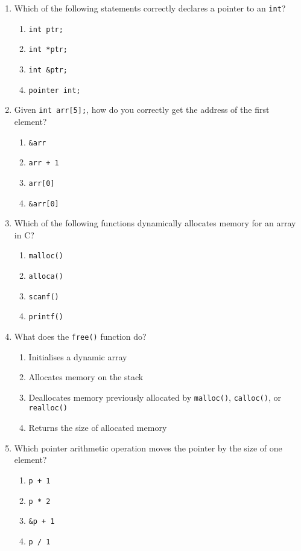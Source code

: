 \documentclass[a4paper,12pt]{article}
\begin{document}
\begin{enumerate}
  \item Which of the following statements correctly declares a pointer to an \texttt{int}?
  \begin{enumerate}[label=(\alph*)]
    \item \texttt{int ptr;}
    \item \texttt{int *ptr;}
    \item \texttt{int \&ptr;}
    \item \texttt{pointer int;}
  \end{enumerate}

  \item Given \texttt{int arr[5];}, how do you correctly get the address of the first element?
  \begin{enumerate}[label=(\alph*)]
    \item \texttt{\&arr}
    \item \texttt{arr + 1}
    \item \texttt{arr[0]}
    \item \texttt{\&arr[0]}
  \end{enumerate}

  \item Which of the following functions dynamically allocates memory for an array in C?
  \begin{enumerate}[label=(\alph*)]
    \item \texttt{malloc()}
    \item \texttt{alloca()}
    \item \texttt{scanf()}
    \item \texttt{printf()}
  \end{enumerate}

  \item What does the \texttt{free()} function do?
  \begin{enumerate}[label=(\alph*)]
    \item Initialises a dynamic array
    \item Allocates memory on the stack
    \item Deallocates memory previously allocated by \texttt{malloc()}, \texttt{calloc()}, or \texttt{realloc()}
    \item Returns the size of allocated memory
  \end{enumerate}

  \item Which pointer arithmetic operation moves the pointer by the size of one element?
  \begin{enumerate}[label=(\alph*)]
    \item \texttt{p + 1}
    \item \texttt{p * 2}
    \item \texttt{\&p + 1}
    \item \texttt{p / 1}
  \end{enumerate}


\end{enumerate}
\end{document}
